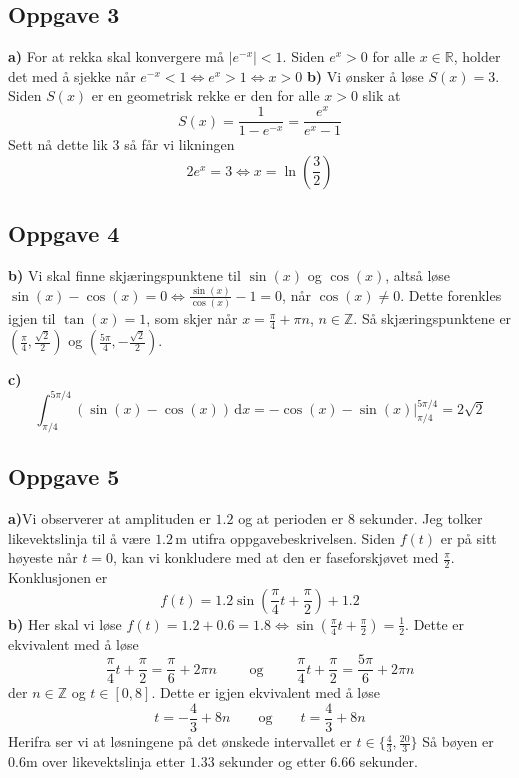 \subsection{Oppgave 3}
\textbf{a)} For at rekka skal konvergere må $|e^{-x}| < 1$. Siden $e^x>0$ for alle $x \in \mathbb{R}$, holder det med å sjekke når $e^{-x} < 1 \Longleftrightarrow e^x>1 \Longleftrightarrow x > 0$ \newline
\textbf{b)} Vi ønsker å løse $S(x)=3$. Siden $S(x)$ er en geometrisk rekke er den for alle $x>0$ slik at $$S(x)=\frac{1}{1-e^{-x}}=\frac{e^x}{e^x-1}$$ Sett nå dette lik $3$ så får vi likningen $$ 2e^x=3 \Longleftrightarrow x = \ln\left(\frac32\right)$$

\subsection{Oppgave 4}
\textbf{b)} Vi skal finne skjæringspunktene til $\sin(x)$ og $\cos(x)$, altså løse $\sin(x)-\cos(x)=0 \Longleftrightarrow \frac{\sin(x)}{\cos(x)} - 1 = 0$, når $\cos(x)\neq 0$. Dette forenkles igjen til $\tan(x)=1$, som skjer når $x=\frac{\pi}{4} + \pi n$, $n \in \mathbb{Z}$. Så skjæringspunktene er $(\frac{\pi}{4}, \frac{\sqrt{2}}{2})$ og $(\frac{5\pi}{4}, -\frac{\sqrt{2}}{{2}})$. \newline

\textbf{c)} $$\int_{\pi/4}^{5\pi/4} \left(\sin(x) - \cos(x)\right) \, \text{d}x = -\cos(x)-\sin(x)\bigg\vert_{\pi/4}^{5\pi/4} = 2\sqrt{2}$$

\subsection{Oppgave 5}
\textbf{a)}Vi observerer at amplituden er $1.2$ og at perioden er $8$ sekunder. Jeg tolker likevektslinja til å være $1.2 \, \text{m}$ utifra oppgavebeskrivelsen. Siden $f(t)$ er på sitt høyeste når $t=0$, kan vi konkludere med at den er faseforskjøvet med $\frac{\pi}{2}$. Konklusjonen er $$f(t)=1.2\sin\left(\frac{\pi}{4}t + \frac{\pi}{2} \right) + 1.2$$
\textbf{b)} Her skal vi løse $f(t)=1.2+0.6=1.8 \Longleftrightarrow \sin\left(\frac\pi4 t + \frac\pi2 \right)=\frac12$. Dette er ekvivalent med å løse $$\frac\pi4 t + \frac\pi2 = \frac\pi6 + 2\pi n \qquad \text{ og } \qquad \frac\pi4 t + \frac\pi2 = \frac{5\pi}{6} + 2\pi n$$ der $n \in \mathbb{Z}$ og $t \in [0,8]$. Dette er igjen ekvivalent med å løse $$t=-\frac{4}{3} + 8n \qquad \text{og} \qquad t=\frac43 + 8n$$ Herifra ser vi at løsningene på det ønskede intervallet er $t\in\{\frac43, \frac{20}{3}\}$ Så bøyen er 0.6m over likevektslinja etter $1.33$ sekunder og etter $6.66$ sekunder.

